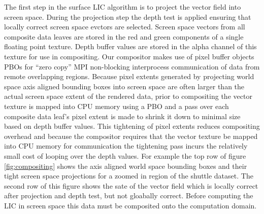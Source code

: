 \documentclass[a4paper,10pt]{article}
\begin{document}
The first step in the surface LIC algorithm is to project the vector field into screen space. During the projection step the depth test is applied ensuring that locally correct screen space evctors are selected. Screen space vectors from all composite data leaves are stored in the red and green components of a single floating point texture. Depth buffer values are stored in the alpha channel of this texture for use in compositing. Our compositor makes use of pixel buffer objects PBOs for ``zero copy'' MPI non-blocking interprocess communication of data from remote overlapping regions. Because pixel extents generated by projecting world space axis aligned bounding boxes into screen space are often larger than the actual screen space extent of the rendered data, prior to compositing the vector texture is mapped into CPU memory using a PBO and a pass over each composite data leaf's pixel extent is made to shrink it down to minimal size based on depth buffer values. This tightening of pixel extents reduces compositing overhead and because the compositor requires that the vector texture be mapped into CPU memory for communication the tightening pass incurs the relatively small cost of looping over the depth values. For example the top row of figure \ref{fig:compositing} shows the axis aligned world space bounding boxes and their tight screen space projections for a zoomed in region of the shuttle dataset. The second row of this figure shows the sate of the vector field which is locally correct after projection and depth test, but not gloabally correct. Before computing the LIC in screen space this data must be composited onto the computation domain.
\end{document}
